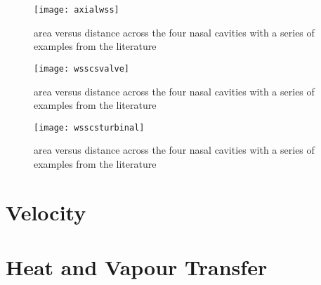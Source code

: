 \begin{figure} \label{fig:wax}
  \texttt{[image: axialwss]}
  \caption{area versus distance across the four nasal cavities with a series of examples from the literature}
\end{figure}

\begin{figure} \label{fig:wcs}
  \texttt{[image: wsscsvalve]}
  \caption{area versus distance across the four nasal cavities with a series of examples from the literature}
\end{figure}

\begin{figure} \label{fig:wcst}
  \texttt{[image: wsscsturbinal]}
  \caption{area versus distance across the four nasal cavities with a series of examples from the literature}
\end{figure}

\section{Velocity}


\section{Heat and Vapour Transfer}

